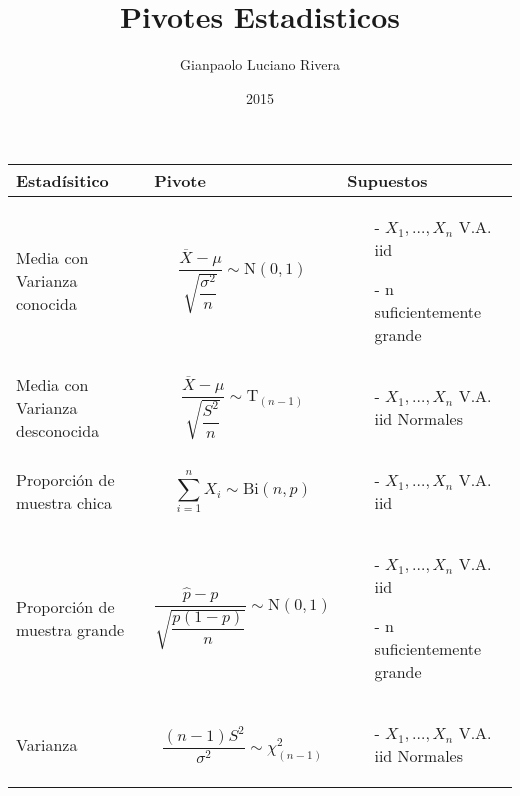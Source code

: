 \documentclass[pdftex,11pt,a4paper]{article}
\begin{document}
\title{Pivotes Estadisticos}
\author{Gianpaolo Luciano Rivera}
\date{2015}
\maketitle


\setlength{\tabcolsep}{12pt}
\begin{tabular}{m{3.5cm} m{7.3cm} m{6.5cm}}
\textbf{Estadísitico} & \textbf{Pivote} & \textbf{Supuestos}\\ 
\hline 
\hline 

Media con Varianza conocida & 
$$\dfrac{\overline{X} - \mu}{\sqrt{\dfrac{\sigma^2}{n}}} \sim \text{N}(0,1)$$  & 
\begin{itemize}
\item[-] $X_1,\ldots, X_n$ V.A. iid
\item[-] n suficientemente grande 
\end{itemize}\\ 
\hline 

Media con Varianza desconocida & 
$$\dfrac{\overline{X} - \mu}{\sqrt{\dfrac{S^2}{n}}} \sim \text{T}_{\left(n-1\right)}$$ &  
\begin{itemize}
\item[-] $X_1,\ldots, X_n$ V.A. iid Normales
\end{itemize}\\ 
\hline 
 
Proporción de muestra chica & 
$$\sum^{n}_{i = 1}X_i \sim \text{Bi}(n,p)$$ & 
\begin{itemize}
\item[-] $X_1,\ldots, X_n$ V.A. iid
\end{itemize}\\ 
\hline

Proporción de muestra grande & 
$$\dfrac{\hat{p}-p}{\sqrt{\dfrac{p\left(1-p\right)}{n}}}\sim \text{N}(0,1)$$ & 
\begin{itemize}
\item[-] $X_1,\ldots, X_n$ V.A. iid
\item[-] n suficientemente grande 
\end{itemize}\\ 
\hline

Varianza & 
$$\dfrac{\left(n-1\right)S^2}{\sigma^2} \sim \chi^2_{\left(n-1\right)}$$ &
\begin{itemize}
\item[-] $X_1,\ldots, X_n$ V.A. iid Normales
\end{itemize}\\ 
\hline


\end{tabular}
\end{document}
